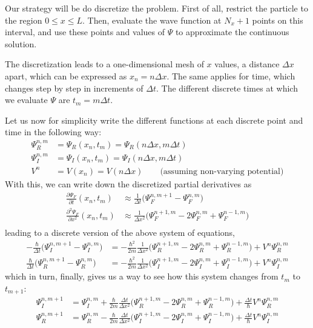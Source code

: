 \documentclass[10pt,a4paper]{article}
\begin{document}
Our strategy will be do discretize the problem. First of all, restrict the particle to the region $0 \leq x \leq L$. Then, evaluate the wave function at $N_x+1$ points on this interval, and use these points and values of $\Psi$ to approximate the continuous solution.

The discretization leads to a one-dimensional mesh of $x$ values, a distance $\Delta x$ apart, which can be expressed as $x_n = n\Delta x$. The same applies for time, which changes step by step in increments of $\Delta t$. The different discrete times at which we evaluate $\Psi$ are $t_m = m\Delta t$.

Let us now for simplicity write the different functions at each discrete point and time in the following way:
\begin{align}
	\Psi_R^{n,m} &= \Psi_R(x_n,t_m) = \Psi_R(n\Delta x,m\Delta t)\\
	\Psi_I^{n,m} &= \Psi_I(x_n,t_m) = \Psi_I(n\Delta x,m\Delta t)\\
	V^n &= V(x_n) = V(n\Delta x) \quad \quad \text{(assuming non-varying potential)}
\end{align}
With this, we can write down the discretized partial derivatives as
\begin{align}
	\frac{\partial \Psi_F}{\partial t} (x_n,t_m)
	&\approx
	\frac{1}{\Delta t} \Big( \Psi_F^{n,m+1} - \Psi_F^{n,m}\Big)\\
	\frac{\partial^2 \Psi_F}{\partial x^2} (x_n,t_m)
	&\approx
	\frac{1}{\Delta x^2} \Big( \Psi_F^{n+1,m} - 2\Psi_F^{n,m} + \Psi_F^{ n-1,m} \Big)\\
\end{align}
leading to a discrete version of the above system of equations,
\begin{align}
	- 
	\frac{\hbar}{\Delta t} \Big( \Psi_I^{n,m+1} - \Psi_I^{n,m}\Big)
	&=
	- \frac{\hbar^2}{2m}
	\frac{1}{\Delta x^2}
	\Big(
		\Psi_R^{n+1,m} - 2\Psi_R^{n,m} + \Psi_R^{ n-1,m}
	\Big)
	+
	V^n
	\Psi_R^{n,m}\\
	\frac{\hbar}{\Delta t} \Big( \Psi_R^{n,m+1} - \Psi_R^{n,m}\Big)
	&=
	- \frac{\hbar^2}{2m}
	\frac{1}{\Delta x^2}
	\Big(
		\Psi_I^{n+1,m} - 2\Psi_I^{n,m} + \Psi_I^{ n-1,m}
	\Big)
	+
	V^n
	\Psi_I^{n,m}
\end{align}
which in turn, finally, gives us a way to see how this system changes from  $t_m$ to $t_{m+1}$:
\begin{align}
	\Psi_I^{n,m+1}
	&=
	\Psi_I^{n,m}
	+
	\frac{\hbar}{2m}
	\frac{\Delta t}{\Delta x^2}
	\Big(
		\Psi_R^{n+1,m} - 2\Psi_R^{n,m} + \Psi_R^{ n-1,m}
	\Big)
	+
	\frac{\Delta t}{\hbar}
	V^n
	\Psi_R^{n,m}\\
	\Psi_R^{n,m+1}
	&=
	\Psi_R^{n,m}
	- \frac{\hbar}{2m}
	\frac{\Delta t}{\Delta x^2}
	\Big(
		\Psi_I^{n+1,m} - 2\Psi_I^{n,m} + \Psi_I^{ n-1,m}
	\Big)
	+
	\frac{\Delta t}{\hbar}
	V^n
	\Psi_I^{n,m}
\end{align}
\end{document}
